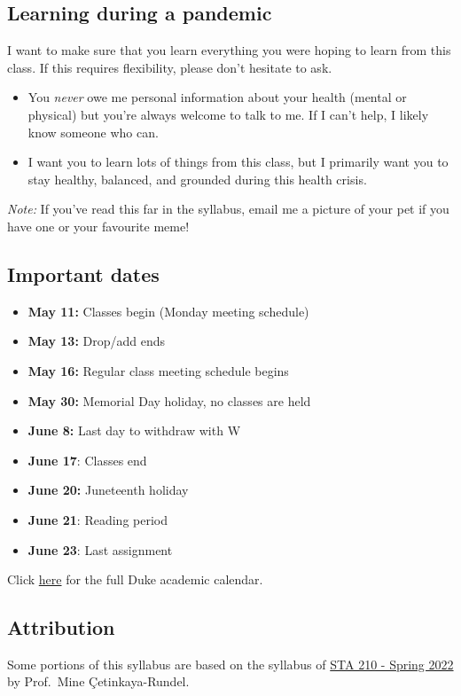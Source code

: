 \documentclass[
  letterpaper,
  DIV=11,
  numbers=noendperiod]{scrartcl}
\providecommand{\tightlist}{%
  \setlength{\itemsep}{0pt}\setlength{\parskip}{0pt}}
\begin{document}
\hypertarget{learning-during-a-pandemic}{%
\subsection{\texorpdfstring{\textbf{Learning during a
pandemic}}{Learning during a pandemic}}\label{learning-during-a-pandemic}}

I want to make sure that you learn everything you were hoping to learn
from this class. If this requires flexibility, please don't hesitate to
ask.

\begin{itemize}
\item
  You \emph{never} owe me personal information about your health (mental
  or physical) but you're always welcome to talk to me. If I can't help,
  I likely know someone who can.
\item
  I want you to learn lots of things from this class, but I primarily
  want you to stay healthy, balanced, and grounded during this health
  crisis.
\end{itemize}

\emph{Note:} If you've read this far in the syllabus, email me a picture
of your pet if you have one or your favourite meme!

\hypertarget{important-dates}{%
\subsection{Important dates}\label{important-dates}}

\begin{itemize}
\tightlist
\item
  \textbf{May 11:} Classes begin (Monday meeting schedule)
\item
  \textbf{May 13:} Drop/add ends
\item
  \textbf{May 16:} Regular class meeting schedule begins
\item
  \textbf{May 30:} Memorial Day holiday, no classes are held
\item
  \textbf{June 8:} Last day to withdraw with W
\item
  \textbf{June 17}: Classes end
\item
  \textbf{June 20:} Juneteenth holiday
\item
  \textbf{June 21}: Reading period
\item
  \textbf{June 23}: Last assignment
\end{itemize}

Click
\href{https://registrar.duke.edu/sumemr-2022-academic-calendar}{here}
for the full Duke academic calendar.

\hypertarget{attribution}{%
\subsection{Attribution}\label{attribution}}

Some portions of this syllabus are based on the syllabus of
\href{https://sta210-s22.github.io/website/}{STA 210 - Spring 2022} by
Prof.~Mine Çetinkaya-Rundel.
\end{document}
